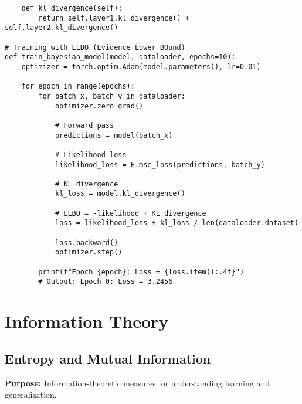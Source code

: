 \documentclass[11pt,a4paper]{book}
\begin{document}
\begin{verbatim}
    def kl_divergence(self):
        return self.layer1.kl_divergence() + self.layer2.kl_divergence()

# Training with ELBO (Evidence Lower BOund)
def train_bayesian_model(model, dataloader, epochs=10):
    optimizer = torch.optim.Adam(model.parameters(), lr=0.01)
    
    for epoch in range(epochs):
        for batch_x, batch_y in dataloader:
            optimizer.zero_grad()
            
            # Forward pass
            predictions = model(batch_x)
            
            # Likelihood loss
            likelihood_loss = F.mse_loss(predictions, batch_y)
            
            # KL divergence
            kl_loss = model.kl_divergence()
            
            # ELBO = -likelihood + KL divergence
            loss = likelihood_loss + kl_loss / len(dataloader.dataset)
            
            loss.backward()
            optimizer.step()
        
        print(f"Epoch {epoch}: Loss = {loss.item():.4f}")
        # Output: Epoch 0: Loss = 3.2456
\end{verbatim}

\section{Information Theory}

\subsection{Entropy and Mutual Information}

\textbf{Purpose:} Information-theoretic measures for understanding learning and generalization.
\end{document}
